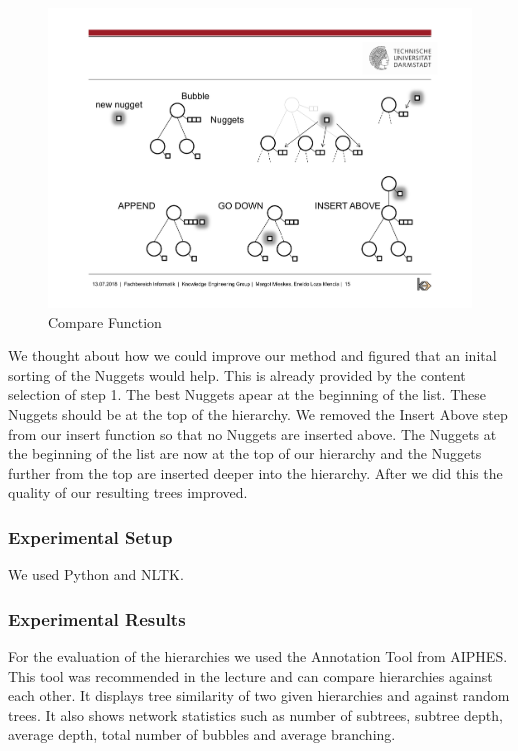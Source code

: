 \begin{figure}[H]
	\centering
	\includegraphics[trim=22.5cm 12.5cm 2.5cm 5.5cm, clip=true]{img/step2_func.pdf}
	\caption{Compare Function}
	\label{fig:jsd}
\end{figure}


We thought about how we could improve our method and figured that an inital sorting of the Nuggets would help. This is already provided by the content selection of step 1. The best Nuggets apear at the beginning of the list. These Nuggets should be at the top of the hierarchy. We removed the Insert Above step from our insert function so that no Nuggets are inserted above. The Nuggets at the beginning of the list are now at the top of our hierarchy and the Nuggets further from the top are inserted deeper into the hierarchy. After we did this the quality of our resulting trees improved.

\subsubsection{Experimental Setup}

We used Python and NLTK.

\subsubsection{Experimental Results}


For the evaluation of the hierarchies we used the Annotation Tool from AIPHES. This tool was recommended in the lecture and can compare hierarchies against each other. It displays tree similarity of two given hierarchies and against random trees. It also shows network statistics such as number of subtrees, subtree depth, average depth, total number of bubbles and average branching.

